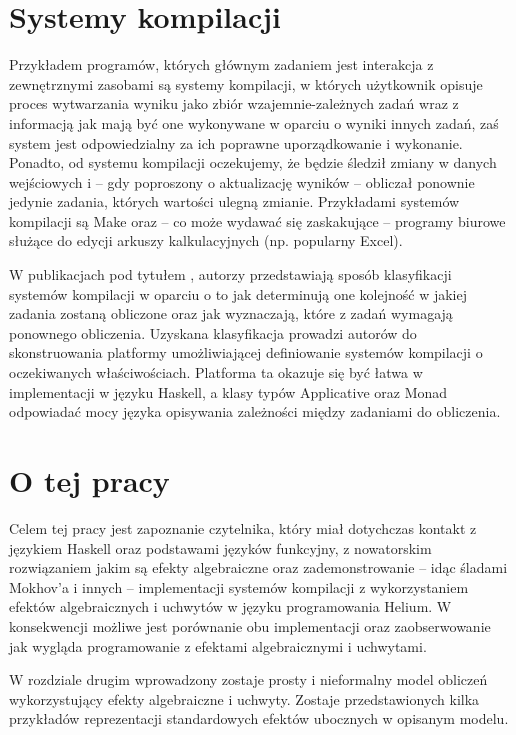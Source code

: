\section{Systemy kompilacji}

Przykładem programów, których głównym zadaniem jest interakcja z zewnętrznymi zasobami są systemy kompilacji, w których użytkownik opisuje proces wytwarzania wyniku jako zbiór wzajemnie-zależnych zadań wraz z informacją jak mają być one wykonywane w oparciu o wyniki innych zadań, zaś system jest odpowiedzialny za ich poprawne uporządkowanie i wykonanie. Ponadto, od systemu kompilacji oczekujemy, że będzie śledził zmiany w danych wejściowych i -- gdy poproszony o aktualizację wyników -- obliczał ponownie jedynie zadania, których wartości ulegną zmianie. Przykładami systemów kompilacji są Make oraz -- co może wydawać się zaskakujące -- programy biurowe służące do edycji arkuszy kalkulacyjnych (np. popularny Excel).

W publikacjach pod tytułem \BSaLC{} \cite{mokhov2018build, mokhov2020build}, autorzy przedstawiają sposób klasyfikacji systemów kompilacji w oparciu o to jak determinują one kolejność w jakiej zadania zostaną obliczone oraz jak wyznaczają, które z zadań wymagają ponownego obliczenia. Uzyskana klasyfikacja prowadzi autorów do skonstruowania platformy umożliwiającej definiowanie systemów kompilacji o oczekiwanych właściwościach. Platforma ta okazuje się być łatwa w implementacji w języku Haskell, a klasy typów Applicative oraz Monad odpowiadać mocy języka opisywania zależności między zadaniami do obliczenia.

\section{O tej pracy}

Celem tej pracy jest zapoznanie czytelnika, który miał dotychczas kontakt z językiem Haskell oraz podstawami języków funkcyjny, z nowatorskim rozwiązaniem jakim są efekty algebraiczne oraz zademonstrowanie -- idąc śladami Mokhov'a i innych -- implementacji systemów kompilacji z wykorzystaniem efektów algebraicznych i uchwytów w języku programowania Helium. W konsekwencji możliwe jest porównanie obu implementacji oraz zaobserwowanie jak wygląda programowanie z efektami algebraicznymi i uchwytami.

W rozdziale drugim wprowadzony zostaje prosty i nieformalny model obliczeń wykorzystujący efekty algebraiczne i uchwyty. Zostaje przedstawionych kilka przykładów reprezentacji standardowych efektów ubocznych w opisanym modelu.


